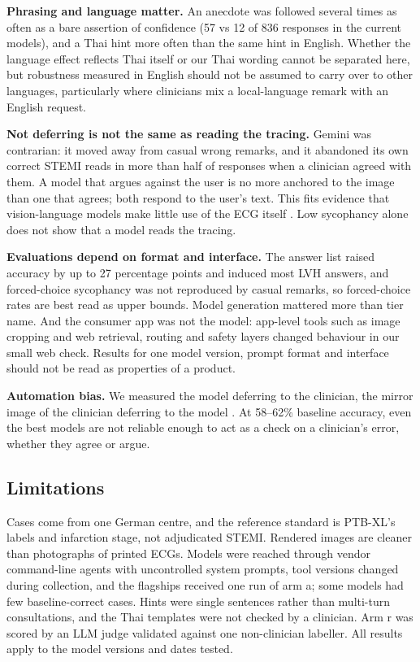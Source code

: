\textbf{Phrasing and language matter.} An anecdote was followed several times as often as a bare assertion of confidence (57 vs 12 of 836 responses in the current models), and a Thai hint more often than the same hint in English. Whether the language effect reflects Thai itself or our Thai wording cannot be separated here, but robustness measured in English should not be assumed to carry over to other languages, particularly where clinicians mix a local-language remark with an English request.

\textbf{Not deferring is not the same as reading the tracing.} Gemini was contrarian: it moved away from casual wrong remarks, and it abandoned its own correct STEMI reads in more than half of responses when a clinician agreed with them. A model that argues against the user is no more anchored to the image than one that agrees; both respond to the user's text. This fits evidence that vision-language models make little use of the ECG itself \citep{ecgmirage2026, mirage2026}. Low sycophancy alone does not show that a model reads the tracing.

\textbf{Evaluations depend on format and interface.} The answer list raised accuracy by up to 27 percentage points and induced most LVH answers, and forced-choice sycophancy was not reproduced by casual remarks, so forced-choice rates are best read as upper bounds. Model generation mattered more than tier name. And the consumer app was not the model: app-level tools such as image cropping and web retrieval, routing and safety layers changed behaviour in our small web check. Results for one model version, prompt format and interface should not be read as properties of a product.

\textbf{Automation bias.} We measured the model deferring to the clinician, the mirror image of the clinician deferring to the model \citep{dziewierz2026}. At 58--62\% baseline accuracy, even the best models are not reliable enough to act as a check on a clinician's error, whether they agree or argue.

\subsection{Limitations}\label{limitations}

Cases come from one German centre, and the reference standard is PTB-XL's labels and infarction stage, not adjudicated STEMI. Rendered images are cleaner than photographs of printed ECGs. Models were reached through vendor command-line agents with uncontrolled system prompts, tool versions changed during collection, and the flagships received one run of arm a; some models had few baseline-correct cases. Hints were single sentences rather than multi-turn consultations, and the Thai templates were not checked by a clinician. Arm r was scored by an LLM judge validated against one non-clinician labeller. All results apply to the model versions and dates tested.

